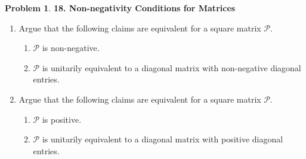 \documentclass{book}
\theoremstyle{definition}
\newtheorem*{prob*}{Problem}
\begin{document}
\newpage




\begin{prob*}\textbf{18. Non-negativity Conditions for Matrices}
	\begin{enumerate}
		\item Argue that the following claims are equivalent for a square matrix $\mathcal{P}$.
		\begin{enumerate}
			\item $\mathcal{P}$ is non-negative.
			\item $\mathcal{P}$ is unitarily equivalent to a diagonal matrix with non-negative diagonal entries.
		\end{enumerate}
	
	
		\item Argue that the following claims are equivalent for a square matrix $\mathcal{P}$.
		\begin{enumerate}
			\item $\mathcal{P}$ is positive.
			\item $\mathcal{P}$ is unitarily equivalent to a diagonal matrix with positive diagonal entries. 
		\end{enumerate}
	\end{enumerate}
	
\end{prob*}


















\newpage
\end{document}
